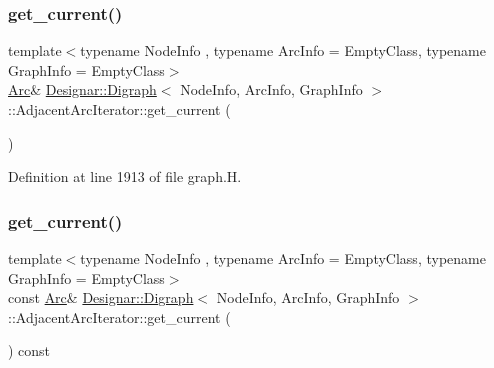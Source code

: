 \subsubsection{\texorpdfstring{get\+\_\+current()}{get\_current()}\hspace{0.1cm}{\footnotesize\ttfamily [1/2]}}
{\footnotesize\ttfamily template$<$typename Node\+Info , typename Arc\+Info  = Empty\+Class, typename Graph\+Info  = Empty\+Class$>$ \\
\hyperlink{class_designar_1_1_digraph_a0ceb278671f2a535c00fddccdeafd69f}{Arc}\& \hyperlink{class_designar_1_1_digraph}{Designar\+::\+Digraph}$<$ Node\+Info, Arc\+Info, Graph\+Info $>$\+::Adjacent\+Arc\+Iterator\+::get\+\_\+current (\begin{DoxyParamCaption}{ }\end{DoxyParamCaption})\hspace{0.3cm}{\ttfamily [inline]}}



Definition at line 1913 of file graph.\+H.

\mbox{\label{class_designar_1_1_digraph_1_1_adjacent_arc_iterator_ac388275a16db45fc754a193766c215ce}} 
\subsubsection{\texorpdfstring{get\+\_\+current()}{get\_current()}\hspace{0.1cm}{\footnotesize\ttfamily [2/2]}}
{\footnotesize\ttfamily template$<$typename Node\+Info , typename Arc\+Info  = Empty\+Class, typename Graph\+Info  = Empty\+Class$>$ \\
const \hyperlink{class_designar_1_1_digraph_a0ceb278671f2a535c00fddccdeafd69f}{Arc}\& \hyperlink{class_designar_1_1_digraph}{Designar\+::\+Digraph}$<$ Node\+Info, Arc\+Info, Graph\+Info $>$\+::Adjacent\+Arc\+Iterator\+::get\+\_\+current (\begin{DoxyParamCaption}{ }\end{DoxyParamCaption}) const\hspace{0.3cm}{\ttfamily [inline]}}



